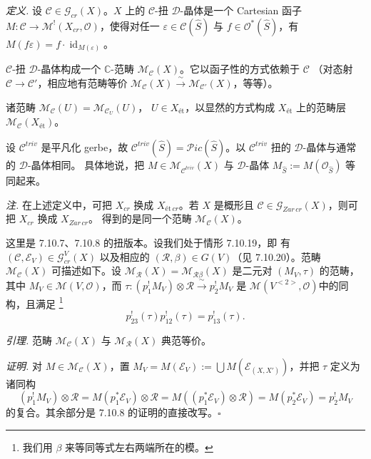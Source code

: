  \emph{定义.} 设 $\mathcal{C}\in\mathcal{G}_{cr}(X)$。$X$ 上的
$\mathcal{C}$-扭 $\mathcal{D}$-晶体是一个 Cartesian 函子
$M:\mathcal{C}\to\mathcal{M}^{!}(X_{cr},\mathcal{O})$，使得对任一
$\varepsilon\in\mathcal{C}(\hat S)$ 与 $f\in\mathcal{O}^*(\hat S)$，有
$M(f\varepsilon)=f\cdot\operatorname{id}_{M(\varepsilon)}$。

$\mathcal{C}$-扭 $\mathcal{D}$-晶体构成一个 $\mathbb{C}$-范畴
$\mathcal{M}_{\mathcal{C}}(X)$。它以函子性的方式依赖于 $\mathcal{C}$
（对态射 $\mathcal{C}\to\mathcal{C}'$，相应地有范畴等价
$\mathcal{M}_{\mathcal{C}}(X)\xrightarrow{\ \sim\ }
\mathcal{M}_{\mathcal{C}'}(X)$，等等）。

诸范畴 $\mathcal{M}_{\mathcal{C}}(U)=\mathcal{M}_{\mathcal{C}_U}(U)$，
$U\in X_{\text{ét}}$，以显然的方式构成 $X_{\text{ét}}$ 上的范畴层
$\mathcal{M}_{\mathcal{C}}(X_{\text{ét}})$。

设 $\mathcal{C}^{triv}$ 是平凡化 gerbe，故
$\mathcal{C}^{triv}(\hat S)=\mathcal{P}ic(\hat S)$。以
$\mathcal{C}^{triv}$ 扭的 $\mathcal{D}$-晶体与通常的 $\mathcal{D}$-晶体相同。
具体地说，把 $M\in\mathcal{M}_{\mathcal{C}^{triv}}(X)$ 与 $\mathcal{D}$-晶体
$M_{\hat S}:=M(\mathcal{O}_{\hat S})$ 等同起来。

\emph{注.} 在上述定义中，可把 $X_{cr}$ 换成
$X_{\text{ét}\,cr}$。若 $X$ 是概形且
$\mathcal{C}\in\mathcal{G}_{Zar\,cr}(X)$，则可把 $X_{cr}$ 换成 $X_{Zar\,cr}$。
得到的是同一个范畴 $\mathcal{M}_{\mathcal{C}}(X)$。

 这里是 7.10.7、7.10.8 的扭版本。设我们处于情形 7.10.19，即
有 $(\mathcal{C},\mathcal{E}_V)\in\mathcal{G}^V_{cr}(X)$ 以及相应的
$(\mathcal{R},\beta)\in G(V)$（见 7.10.20）。范畴
$\mathcal{M}_{\mathcal{C}}(X)$ 可描述如下。设
$\mathcal{M}_{\mathcal{R}}(X)=\mathcal{M}_{\mathcal{R}\beta}(X)$ 是二元对
$(M_V,\tau)$ 的范畴，其中 $M_V\in\mathcal{M}(V,\mathcal{O})$，而
$\tau:(p_1^{!}M_V)\otimes\mathcal{R}\xrightarrow{\ \sim\ }p_2^{!}M_V$
是 $\mathcal{M}(V^{<2>},\mathcal{O})$中的同构，且满足%
\footnote{我们用 $\beta$ 来等同等式左右两端所在的模。}
\begin{equation}\tag{344}
p_{23}^{!}(\tau)p_{12}^{!}(\tau)=p_{13}^{!}(\tau).
\end{equation}

 \emph{引理.} 范畴 $\mathcal{M}_{\mathcal{C}}(X)$ 与
$\mathcal{M}_{\mathcal{R}}(X)$ 典范等价。

\emph{证明.} 对 $M\in\mathcal{M}_{\mathcal{C}}(X)$，置
$M_V=M(\mathcal{E}_V):=\bigcup M(\mathcal{E}_{(X,X')})$，并把 $\tau$ 定义为诸同构
\[
(p_1^{!}M_V)\otimes\mathcal{R}=M(p_1^*\mathcal{E}_V)\otimes\mathcal{R}
=M((p_1^*\mathcal{E}_V)\otimes\mathcal{R})
=M(p_2^*\mathcal{E}_V)=p_2^{!}M_V
\]
的复合。其余部分是 7.10.8 的证明的直接改写。\hfill$\square$


